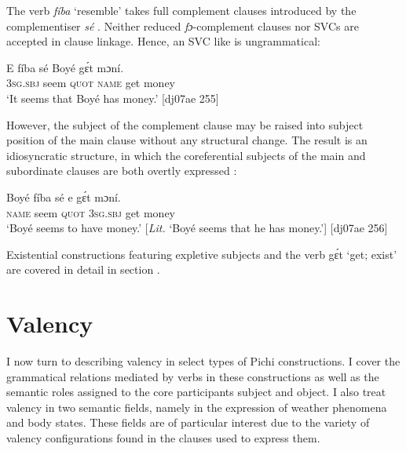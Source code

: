\z

The verb \textit{fíba} ‘resemble’ takes full complement clauses introduced by the complementiser \textit{sé} . Neither reduced \textit{fɔ}{}-complement clauses nor SVCs are accepted in clause linkage. Hence, an SVC like  is ungrammatical:


\ea%
    \label{ex:key:1154}
    \gll E    fíba    sé    Boyé  gɛ́t  mɔní.\\
\textsc{3sg.sbj}  seem  \textsc{quot}    \textsc{name}  get  money\\

\glt ‘It seems that Boyé has money.’ [dj07ae 255]
\z


\z

However, the subject of the complement clause may be raised into subject position of the main clause without any structural change. The result is an idiosyncratic structure, in which the coreferential subjects of the main and subordinate clauses are both overtly expressed :


\ea%
    \label{ex:key:1156}
    \gll Boyé  fíba    sé    e    gɛ́t  mɔní.\\
\textsc{name}  seem  \textsc{quot}    \textsc{3sg.sbj}  get  money\\

\glt ‘Boyé seems to have money.’ [\textit{Lit.} ‘Boyé seems that he has money.’] [dj07ae 256]
\z

Existential constructions featuring expletive subjects and the verb gɛ́t ‘get; exist’ are covered in detail in section .

\section{Valency}\label{sec:9.3}

I now turn to describing valency in select types of Pichi constructions. I cover the grammatical relations mediated by verbs in these constructions as well as the semantic roles assigned to the core participants subject and object. I also treat valency in two semantic fields, namely in the expression of weather phenomena and body states. These fields are of particular interest due to the variety of valency configurations found in the clauses used to express them.

